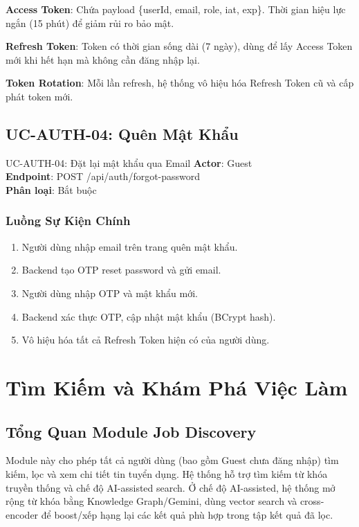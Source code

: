 \documentclass[12pt, a4paper]{report}
\begin{document}
\textbf{Access Token}: Chứa payload \{userId, email, role, iat, exp\}. Thời gian hiệu lực ngắn (15 phút) để giảm rủi ro bảo mật.

\textbf{Refresh Token}: Token có thời gian sống dài (7 ngày), dùng để lấy Access Token mới khi hết hạn mà không cần đăng nhập lại.

\textbf{Token Rotation}: Mỗi lần refresh, hệ thống vô hiệu hóa Refresh Token cũ và cấp phát token mới.

\section{UC-AUTH-04: Quên Mật Khẩu}

\begin{requirementbox}{UC-AUTH-04: Đặt lại mật khẩu qua Email}
\textbf{Actor}: Guest \\
\textbf{Endpoint}: POST /api/auth/forgot-password \\
\textbf{Phân loại}: Bắt buộc
\end{requirementbox}

\subsection{Luồng Sự Kiện Chính}

\begin{enumerate}
    \item Người dùng nhập email trên trang quên mật khẩu.
    \item Backend tạo OTP reset password và gửi email.
    \item Người dùng nhập OTP và mật khẩu mới.
    \item Backend xác thực OTP, cập nhật mật khẩu (BCrypt hash).
    \item Vô hiệu hóa tất cả Refresh Token hiện có của người dùng.
\end{enumerate}

\chapter{Tìm Kiếm và Khám Phá Việc Làm}

\section{Tổng Quan Module Job Discovery}

Module này cho phép tất cả người dùng (bao gồm Guest chưa đăng nhập) tìm kiếm, lọc và xem chi tiết tin tuyển dụng. Hệ thống hỗ trợ tìm kiếm từ khóa truyền thống và chế độ AI-assisted search. Ở chế độ AI-assisted, hệ thống mở rộng từ khóa bằng Knowledge Graph/Gemini, dùng vector search và cross-encoder để boost/xếp hạng lại các kết quả phù hợp trong tập kết quả đã lọc.
\end{document}
